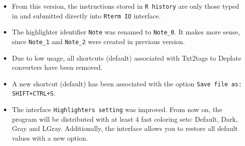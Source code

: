 \begin{itemize}
  \item From this version, the instructions stored in \texttt{R history} are only those typed in and submitted directly into \texttt{Rterm IO} interface.
  \item The highlighter identifier \texttt{Note} was renamed to \texttt{Note\_0}. It makes more sense, since \texttt{Note\_1} and \texttt{Note\_2} were created
    in previous version.
  \item Due to low usage, all shortcuts (default) associated with Txt2tags to Deplate converters have been removed.
  \item A new shortcut (default) has been associated with the option \texttt{Save file as: SHIFT+CTRL+S}.
  \item The interface \texttt{Highlighters setting} was improved. From now on, the program will be distributed with at least 4 fast coloring sets:
    Default, Dark, Gray and LGray. Additionally, the interface allows you to restore all default values with a new option.
\end{itemize}
